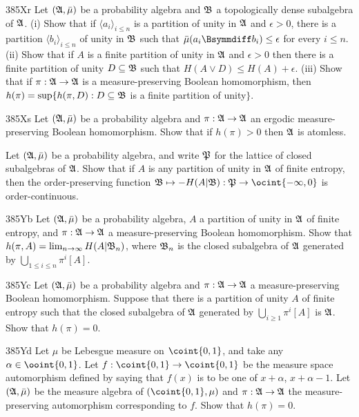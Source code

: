 {\spheader 385Xr %
Let $(\frak A,\bar\mu)$ be a probability algebra and $\frak B$ a topologically dense subalgebra of $\frak A$.   (i) Show that if
$\langle a_i\rangle_{i\le n}$ is a partition of unity in $\frak A$ and $\epsilon>0$, there is a partition $\langle b_i\rangle_{i\le n}$ of unity
in $\frak B$ such that $\bar\mu(a_i\Bsymmdiff b_i)\le\epsilon$ for every $i\le n$.   (ii) Show that if $A$ is a finite partition of unity in
$\frak A$ and $\epsilon>0$ then there is a finite partition of unity $D\subseteq\frak B$ such that $H(A\vee D)\le H(A)+\epsilon$.   (iii) Show that if
$\pi:\frak A\to\frak A$ is a measure-preserving Boolean homomorphism, then $h(\pi)=\sup\{h(\pi,D):D\subseteq\frak B$ is a finite partition of unity$\}$.

\spheader 385Xs Let $(\frak A,\bar\mu)$ be a probability algebra 
and $\pi:\frak A\to\frak A$ an ergodic measure-preserving Boolean 
homomorphism.   Show that if $h(\pi)>0$ then $\frak A$ is atomless.
     
Let $(\frak A,\bar\mu)$ be a probability algebra, and
write $\frak P$ for the lattice of closed subalgebras of $\frak A$.
Show that if $A$ is any partition of unity in $\frak A$ of finite
entropy, then the
order-preserving function $\frak B\mapsto -H(A|\frak B):
\frak P\to\ocint{-\infty,0}$ is order-continuous.
     
\spheader 385Yb %
Let $(\frak A,\bar\mu)$ be a probability algebra, $A$ a
partition of unity in $\frak A$ of finite entropy, and
$\pi:\frak A\to\frak A$ a
measure-preserving Boolean homomorphism.   Show that
$h(\pi,A)=\lim_{n\to\infty}H(A|\frak B_n)$, where $\frak B_n$ is the
closed subalgebra of $\frak A$ generated by
$\bigcup_{1\le i\le n}\pi^i[A]$.   
     
\spheader 385Yc %
Let $(\frak A,\bar\mu)$ be a probability algebra and
$\pi:\frak A\to\frak A$ a measure-preserving Boolean homomorphism.
Suppose that there is a partition of unity $A$ of finite entropy such
that the closed subalgebra of $\frak A$ generated by $\bigcup_{i\ge
1}\pi^i[A]$ is $\frak A$.   Show that $h(\pi)=0$.   
     
\spheader 385Yd %
Let $\mu$ be Lebesgue measure on $\coint{0,1}$, and take
any $\alpha\in\ooint{0,1}$.   Let
$f:\coint{0,1}\to\coint{0,1}$ be the measure space automorphism defined
by saying that $f(x)$ is to be one of $x+\alpha$, $x+\alpha-1$.   Let
$(\frak A,\bar\mu)$ be the measure algebra of $(\coint{0,1},\mu)$ and
$\pi:\frak A\to\frak A$ the measure-preserving automorphism
corresponding to $f$.   Show that $h(\pi)=0$.   
     
}
